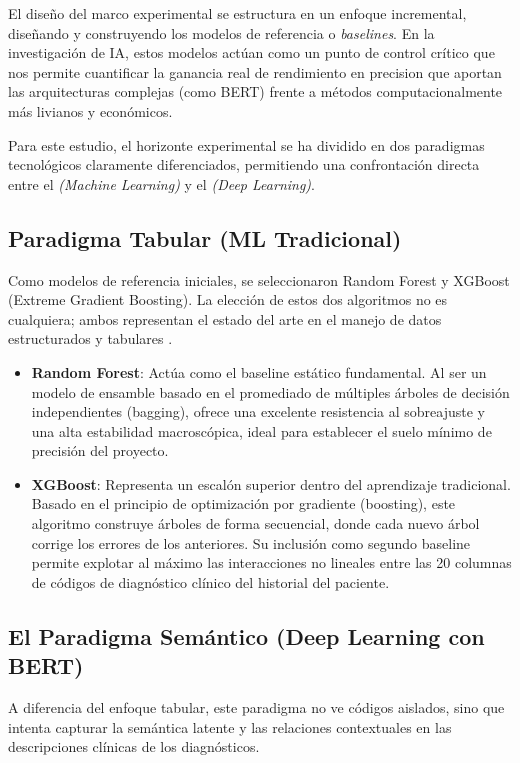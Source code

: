 \documentclass[12pt,a4paper,onecolumn,oneside]{report}
\begin{document}
El diseño del marco experimental se estructura en un enfoque incremental, diseñando y construyendo los modelos de referencia o \textit{baselines}. En la investigación de IA, estos modelos actúan como un punto de control crítico que nos permite cuantificar la ganancia real de rendimiento en precision que aportan las arquitecturas complejas (como BERT) frente a métodos computacionalmente más livianos y económicos.

Para este estudio, el horizonte experimental se ha dividido en dos paradigmas tecnológicos claramente diferenciados, permitiendo una confrontación directa entre el \textit{(Machine Learning)} y el \textit{(Deep Learning)}.

\subsection{Paradigma Tabular (ML Tradicional)}
Como modelos de referencia iniciales, se seleccionaron Random Forest y XGBoost (Extreme Gradient Boosting). La elección de estos dos algoritmos no es cualquiera; ambos representan el estado del arte en el manejo de datos estructurados y tabulares \cite{grinsztajn2022why}.
\begin{itemize}
    \item \textbf{Random Forest}: Actúa como el baseline estático fundamental. Al ser un modelo de ensamble basado en el promediado de múltiples árboles de decisión independientes (bagging), ofrece una excelente resistencia al sobreajuste y una alta estabilidad macroscópica, ideal para establecer el suelo mínimo de precisión del proyecto.

    \item \textbf{XGBoost}: Representa un escalón superior dentro del aprendizaje tradicional. Basado en el principio de optimización por gradiente (boosting), este algoritmo construye árboles de forma secuencial, donde cada nuevo árbol corrige los errores de los anteriores. Su inclusión como segundo baseline permite explotar al máximo las interacciones no lineales entre las 20 columnas de códigos de diagnóstico clínico del historial del paciente.
\end{itemize}

\subsection{El Paradigma Semántico (Deep Learning con BERT)}
A diferencia del enfoque tabular, este paradigma no ve códigos aislados, sino que intenta capturar la semántica latente y las relaciones contextuales en las descripciones clínicas de los diagnósticos.
\end{document}
